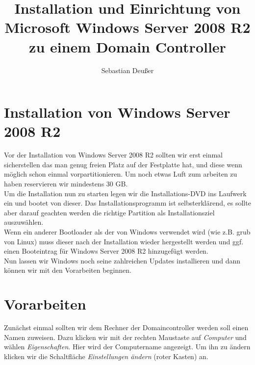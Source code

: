 \documentclass[12pt,a4paper,titlepage]{scrartcl} %
\title{Installation und Einrichtung von Microsoft Windows Server 2008 R2 zu einem Domain Controller}
\author{Sebastian Deußer}
\begin{document}
\maketitle %

\noindent
\pagestyle{fancy}
\lhead{}
\chead{\leftmark}
\rhead{}
\cfoot{}

\noindent

\thispagestyle{fancy}
\tableofcontents

\newpage
\section{Installation von Windows Server 2008 R2}
Vor der Installation von Windows Server 2008 R2 sollten wir erst einmal sicherstellen das man genug freien Platz auf der Festplatte hat, und diese wenn möglich schon einmal vorpartitionieren. Um noch etwas Luft zum arbeiten zu haben reservieren wir mindestens 30 GB.\\
Um die Installation nun zu starten legen wir die Installations-DVD ins Laufwerk ein und bootet von dieser. Das Installationsprogramm ist selbsterklärend, es sollte aber darauf geachten werden die richtige Partition als Installationsziel auszuwählen.\\
Wenn ein anderer Bootloader als der von Windows verwendet wird (wie z.B. grub von Linux) muss dieser nach der Installation wieder hergestellt werden und ggf. einen Booteintrag für Windows Server 2008 R2 hinzugefügt werden.\\
Nun lassen wir Windows noch seine zahlreichen Updates installieren und dann können wir mit den Vorarbeiten beginnen.

\newpage
\section{Vorarbeiten}
Zunächst einmal sollten wir dem Rechner der Domaincontroller werden soll einen Namen zuweisen. Dazu klicken wir mit der rechten Maustaste auf \emph{Computer} und wählen \emph{Eigenschaften}. Hier wird der Computername angezeigt. Um ihn zu ändern klicken wir die Schaltfläche \emph{Einstellungen ändern} (roter Kasten) an.
\end{document}
